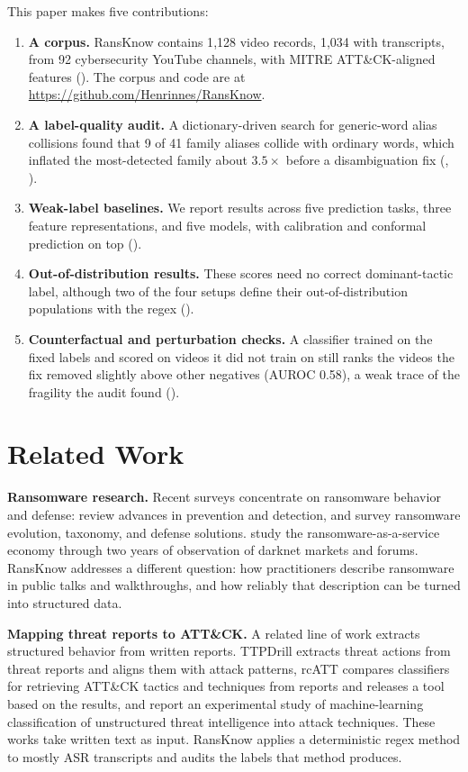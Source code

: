 \documentclass[preprint,12pt]{elsarticle}
\begin{document}
This paper makes five contributions:
\begin{enumerate}
\item \textbf{A corpus.} RansKnow contains 1{,}128 video records, 1{,}034
  with transcripts, from 92 cybersecurity YouTube channels, with MITRE
  ATT\&CK-aligned features (). The corpus and code
  are at \url{https://github.com/Henrinnes/RansKnow}.
\item \textbf{A label-quality audit.} A dictionary-driven search for
  generic-word alias collisions found that 9 of 41 family aliases collide
  with ordinary words, which inflated the most-detected family about
  $3.5\times$ before a disambiguation fix (,
  ).
\item \textbf{Weak-label baselines.} We report results across five
  prediction tasks, three feature representations, and five models, with
  calibration and conformal prediction on top ().
\item \textbf{Out-of-distribution results.} These scores need no correct
  dominant-tactic label, although two of the four setups define their
  out-of-distribution populations with the regex ().
\item \textbf{Counterfactual and perturbation checks.} A classifier
  trained on the fixed labels and scored on videos it did not train on
  still ranks the videos the fix removed slightly above other negatives
  (AUROC 0.58), a weak trace of the fragility the audit found
  ().
\end{enumerate}

\section{Related Work}
\label{sec:related}

\textbf{Ransomware research.} Recent surveys concentrate on ransomware
behavior and defense: \citet{beaman2021ransomware} review advances in
prevention and detection, and \citet{oz2022survey} survey ransomware
evolution, taxonomy, and defense solutions. \citet{meland2020raas} study
the ransomware-as-a-service economy through two years of observation of
darknet markets and forums. RansKnow addresses a different question: how
practitioners describe ransomware in public talks and walkthroughs, and
how reliably that description can be turned into structured data.

\textbf{Mapping threat reports to ATT\&CK.} A related line of work
extracts structured behavior from written reports. TTPDrill
\citep{husari2017ttpdrill} extracts threat actions from threat reports
and aligns them with attack patterns, rcATT \citep{legoy2020rcatt}
compares classifiers for retrieving ATT\&CK tactics and techniques from
reports and releases a tool based on the results, and
\citet{orbinato2022mapping} report an experimental study of
machine-learning classification of unstructured threat intelligence into
attack techniques. These works take written text as input. RansKnow
applies a deterministic regex method to mostly ASR transcripts and audits
the labels that method produces.
\end{document}
